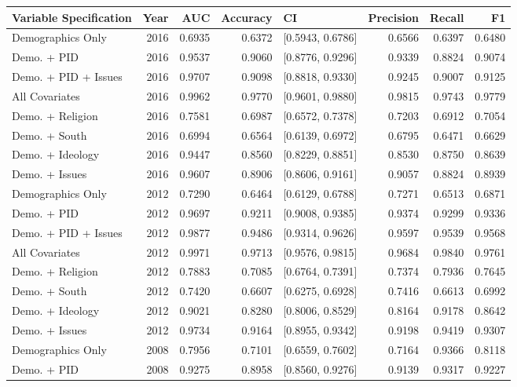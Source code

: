 \begin{longtable}{lrrrlrrr}
  \toprule
Variable Specification & Year & AUC & Accuracy & CI & Precision & Recall & F1 \\ 
  \midrule
Demographics Only & 2016 & 0.6935 & 0.6372 & [0.5943, 0.6786] & 0.6566 & 0.6397 & 0.6480 \\ 
  Demo. + PID & 2016 & 0.9537 & 0.9060 & [0.8776, 0.9296] & 0.9339 & 0.8824 & 0.9074 \\ 
  Demo. + PID + Issues & 2016 & 0.9707 & 0.9098 & [0.8818, 0.9330] & 0.9245 & 0.9007 & 0.9125 \\ 
  All Covariates & 2016 & 0.9962 & 0.9770 & [0.9601, 0.9880] & 0.9815 & 0.9743 & 0.9779 \\ 
  Demo. + Religion & 2016 & 0.7581 & 0.6987 & [0.6572, 0.7378] & 0.7203 & 0.6912 & 0.7054 \\ 
  Demo. + South & 2016 & 0.6994 & 0.6564 & [0.6139, 0.6972] & 0.6795 & 0.6471 & 0.6629 \\ 
  Demo. + Ideology & 2016 & 0.9447 & 0.8560 & [0.8229, 0.8851] & 0.8530 & 0.8750 & 0.8639 \\ 
  Demo. + Issues & 2016 & 0.9607 & 0.8906 & [0.8606, 0.9161] & 0.9057 & 0.8824 & 0.8939 \\ 
  Demographics Only & 2012 & 0.7290 & 0.6464 & [0.6129, 0.6788] & 0.7271 & 0.6513 & 0.6871 \\ 
  Demo. + PID & 2012 & 0.9697 & 0.9211 & [0.9008, 0.9385] & 0.9374 & 0.9299 & 0.9336 \\ 
  Demo. + PID + Issues & 2012 & 0.9877 & 0.9486 & [0.9314, 0.9626] & 0.9597 & 0.9539 & 0.9568 \\ 
  All Covariates & 2012 & 0.9971 & 0.9713 & [0.9576, 0.9815] & 0.9684 & 0.9840 & 0.9761 \\ 
  Demo. + Religion & 2012 & 0.7883 & 0.7085 & [0.6764, 0.7391] & 0.7374 & 0.7936 & 0.7645 \\ 
  Demo. + South & 2012 & 0.7420 & 0.6607 & [0.6275, 0.6928] & 0.7416 & 0.6613 & 0.6992 \\ 
  Demo. + Ideology & 2012 & 0.9021 & 0.8280 & [0.8006, 0.8529] & 0.8164 & 0.9178 & 0.8642 \\ 
  Demo. + Issues & 2012 & 0.9734 & 0.9164 & [0.8955, 0.9342] & 0.9198 & 0.9419 & 0.9307 \\ 
  Demographics Only & 2008 & 0.7956 & 0.7101 & [0.6559, 0.7602] & 0.7164 & 0.9366 & 0.8118 \\ 
  Demo. + PID & 2008 & 0.9275 & 0.8958 & [0.8560, 0.9276] & 0.9139 & 0.9317 & 0.9227 \\ 

\end{longtable}
